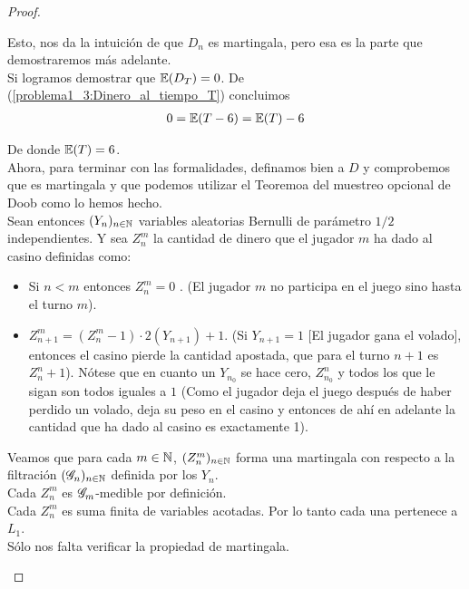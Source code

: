 \begin{proof}
\begin{enumerate}
		   	Esto, nos da la intuición de que $D_n$ es martingala, pero esa es la parte que demostraremos más adelante.\\
		   
			Si logramos demostrar que $\mathbb{E}(D_T) = 0$. De (\ref{problema1_3:Dinero_al_tiempo_T}) concluimos
			\begin{align}
				0 = \mathbb{E}(T - 6) = \mathbb{E}(T) - 6
			\end{align}
			
			De donde $\mathbb{E}(T) = 6$.\\
			
			Ahora, para terminar con las formalidades, definamos bien a $D$ y comprobemos que es martingala y 
			que podemos utilizar el Teoremoa del muestreo opcional de Doob como lo hemos hecho.\\
			
			Sean entonces $(Y_n)_{n \in \mathbb{N}}$ variables aleatorias Bernulli de parámetro $1/2$ independientes.
			Y sea $Z_n^m$ la cantidad de dinero que el jugador $m$ ha dado al casino definidas como:
			
			\begin{itemize}
				\item 
					Si $n < m$ entonces $Z_n^m = 0$ . (El jugador $m$ no participa en el juego sino hasta el turno $m$).
				\item
					$Z_{n+1}^{m} = (Z_n^{m} - 1) \cdot 2(Y_{n+1}) + 1$. (Si $Y_{n + 1} = 1$ [El jugador gana el volado], entonces el casino
					pierde la cantidad apostada, que para el turno $n+1$ es $Z_n^n + 1$). Nótese que en cuanto un $Y_{n_0}$ se hace cero,
					$Z_{n_0}^{n}$ y todos los que le sigan son todos iguales a $1$ (Como el jugador deja el juego después de haber perdido
					un volado, deja su peso en el casino y entonces de ahí en adelante la cantidad que ha dado al casino es exactamente 1).
			\end{itemize}
			
			Veamos que para cada $m \in \mathbb{N}$, $(Z_n^m)_{n \in \mathbb{N}}$ forma una martingala con respecto a la filtración $(\mathscr{G}_n)_{n \in \mathbb{N}}$ 
			definida por los $Y_n$.\\
			
			Cada $Z_n^m$ es $\mathscr{G}_m$-medible por definición.\\
			
			Cada $Z_n^m$ es suma finita de variables acotadas. Por lo tanto cada una pertenece a $L_1$.\\
			
			Sólo nos falta verificar la propiedad de martingala.
			

\end{enumerate}
\end{proof}
